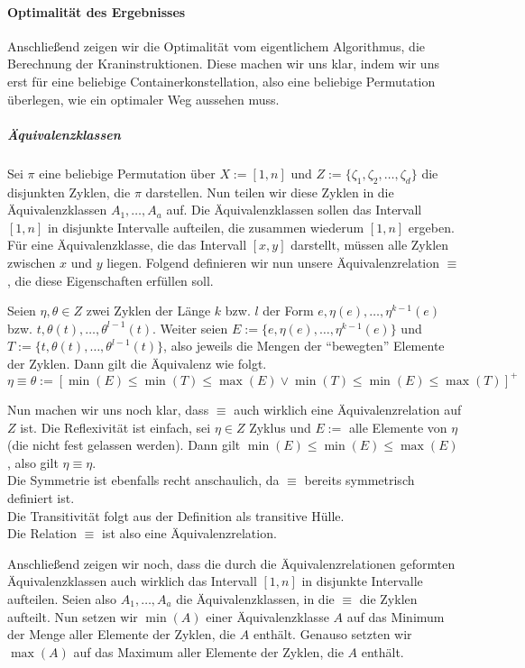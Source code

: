 \paragraph{Optimalität des Ergebnisses}
Anschließend zeigen wir die Optimalität vom eigentlichem Algorithmus, die Berechnung der Kraninstruktionen.
Diese machen wir uns klar, indem wir uns erst für eine beliebige Containerkonstellation, also eine beliebige Permutation überlegen, wie ein optimaler Weg aussehen muss.
\subparagraph{Äquivalenzklassen}
Sei $\pi$ eine beliebige Permutation über $X := [1,n]$ und $Z := \{\zeta_1, \zeta_2, \dots, \zeta_d\}$ die disjunkten Zyklen, die $\pi$ darstellen.
Nun teilen wir diese Zyklen in die Äquivalenzklassen $A_1, \dots, A_a$ auf.
Die Äquivalenzklassen sollen das Intervall $[1,n]$ in disjunkte Intervalle aufteilen, die zusammen wiederum $[1,n]$ ergeben.
Für eine Äquivalenzklasse, die das Intervall $[x,y]$ darstellt, müssen alle Zyklen zwischen $x$ und $y$ liegen.
Folgend definieren wir nun unsere Äquivalenzrelation $\equiv$, die diese Eigenschaften erfüllen soll.

Seien $\eta,\theta \in Z$ zwei Zyklen der Länge $k$ bzw. $l$ der Form $e, \eta(e), \dots, \eta^{k-1}(e)$ bzw. $t, \theta(t), \dots, \theta^{l-1}(t)$.
Weiter seien $E := \{e, \eta(e), \dots, \eta^{k-1}(e)\}$ und $T := \{t, \theta(t), \dots, \theta^{l-1}(t)\}$, also jeweils die Mengen der ``bewegten'' Elemente der Zyklen.
Dann gilt die Äquivalenz wie folgt.
\[ \eta \equiv \theta := [\min(E) \leq \min(T) \leq \max(E) \vee \min(T) \leq \min(E) \leq \max(T) ]^+ \]

Nun machen wir uns noch klar, dass $\equiv$ auch wirklich eine Äquivalenzrelation auf $Z$ ist.
Die Reflexivität ist einfach, sei $\eta \in Z$ Zyklus und $E := $ alle Elemente von $\eta$ (die nicht fest gelassen werden).
Dann gilt $\min(E) \leq \min(E) \leq \max(E)$, also gilt $\eta \equiv \eta$.\\
Die Symmetrie ist ebenfalls recht anschaulich, da $\equiv$ bereits symmetrisch definiert ist.\\
Die Transitivität folgt aus der Definition als transitive Hülle.\\
Die Relation $\equiv$ ist also eine Äquivalenzrelation.

Anschließend zeigen wir noch, dass die durch die Äquivalenzrelationen geformten Äquivalenzklassen auch wirklich das Intervall $[1,n]$ in
 disjunkte Intervalle aufteilen.
Seien also $A_1, \dots, A_a$ die Äquivalenzklassen, in die $\equiv$ die Zyklen aufteilt.
Nun setzen wir $\min(A)$ einer Äquivalenzklasse $A$ auf das Minimum der Menge aller Elemente der Zyklen, die $A$ enthält.
Genauso setzten wir $\max(A)$ auf das Maximum aller Elemente der Zyklen, die $A$ enthält.

